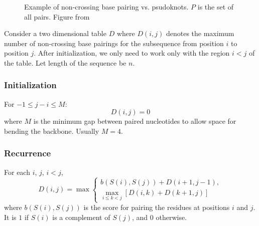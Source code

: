 \documentclass[journal]{IEEEtran}
\begin{document}
\begin{figure}[h]
\centering
{}
\hfil
{}
\caption{Example of non-crossing base pairing vs. psudoknots. $P$ is the set of all pairs. Figure from \cite{MITfigure}}
\label{crossingRNA}
\end{figure}

Consider a two dimensional table $D$ where $D(i,j)$ denotes the maximum number of non-crossing base pairings for the subsequence from position $i$ to position $j$. After initialization, we only need to work only with the region $i<j$ of the table. Let length of the sequence be $n$.

\subsubsection{Initialization}

For $-1 \leq j-i \leq M$:
\[
D(i,j)=0
\] where $M$ is the minimum gap between paired nucleotides to allow space for bending the backbone. Usually $M=4$.

\subsubsection{Recurrence}

For each $i$, $j$, $i<j$,
\begin{equation}\label{recurrence}
D(i,j) = \max \begin{cases} b(S(i),S(j)) + D(i+1,j-1),\\
\max\limits_{i\leq k<j}[D(i,k) + D(k+1, j)]
\end{cases}
\end{equation}
where $b(S(i),S(j))$ is the score for pairing the residues at positions $i$ and $j$. It is $1$ if $S(i)$ is a complement of $S(j)$, and $0$ otherwise.
\end{document}

